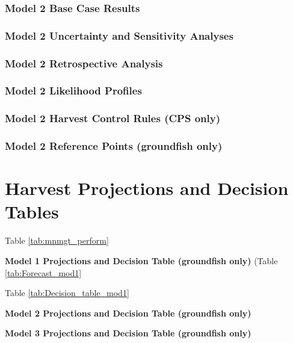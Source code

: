 \documentclass[12pt,]{article}
\begin{document}
\subsubsection{Model 2 Base Case
Results}\label{model-2-base-case-results}

\subsubsection{Model 2 Uncertainty and Sensitivity
Analyses}\label{model-2-uncertainty-and-sensitivity-analyses}

\subsubsection{Model 2 Retrospective
Analysis}\label{model-2-retrospective-analysis}

\subsubsection{Model 2 Likelihood
Profiles}\label{model-2-likelihood-profiles}

\subsubsection{Model 2 Harvest Control Rules (CPS
only)}\label{model-2-harvest-control-rules-cps-only}

\subsubsection{Model 2 Reference Points (groundfish
only)}\label{model-2-reference-points-groundfish-only}

\newpage

\section{Harvest Projections and Decision
Tables}\label{harvest-projections-and-decision-tables}

Table \ref{tab:mnmgt_perform}

\textbf{Model 1 Projections and Decision Table (groundfish only)} (Table
\ref{tab:Forecast_mod1}

Table \ref{tab:Decision_table_mod1}

\textbf{Model 2 Projections and Decision Table (groundfish only)}

\textbf{Model 3 Projections and Decision Table (groundfish only)}
\end{document}
